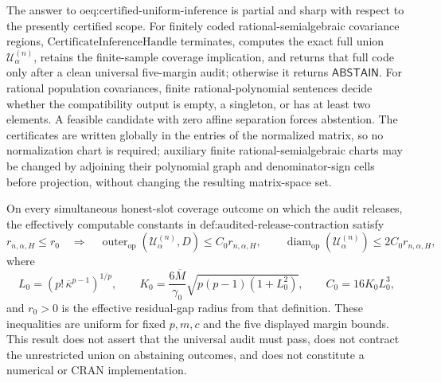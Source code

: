 The answer to \(\text{oeq:certified-uniform-inference}\) is partial and sharp with respect to the presently certified scope.  For finitely coded rational-semialgebraic covariance regions, \(\text{CertificateInferenceHandle}\) terminates, computes the exact full union \(\mathcal U^{(n)}_\alpha\), retains the finite-sample coverage implication, and returns that full code only after a clean universal five-margin audit; otherwise it returns \(\mathsf{ABSTAIN}\).  For rational population covariances, finite rational-polynomial sentences decide whether the compatibility output is empty, a singleton, or has at least two elements.  A feasible candidate with zero affine separation forces abstention.  The certificates are written globally in the entries of the normalized matrix, so no normalization chart is required; auxiliary finite rational-semialgebraic charts may be changed by adjoining their polynomial graph and denominator-sign cells before projection, without changing the resulting matrix-space set.

On every simultaneous honest-slot coverage outcome on which the audit releases, the effectively computable constants in \(\text{def:audited-release-contraction}\) satisfy
\[
 r_{n,\alpha,H}\leq r_0
 \quad\Longrightarrow\quad
 \operatorname{outer}_{\mathrm{op}}(\mathcal U^{(n)}_\alpha,D)
 \leq C_0r_{n,\alpha,H},
 \qquad
 \operatorname{diam}_{\mathrm{op}}(\mathcal U^{(n)}_\alpha)
 \leq2C_0r_{n,\alpha,H},
\]
where
\[
 L_0=(p!\,\overline\kappa^{p-1})^{1/p},\qquad
 K_0=\frac{6\overline M}{\gamma _0}\sqrt{p(p-1)(1+L_0^2)},
 \qquad C_0=16K_0L_0^3,
\]
and \(r_0>0\) is the effective residual-gap radius from that definition.  These inequalities are uniform for fixed \(p,m,c\) and the five displayed margin bounds.  This result does not assert that the universal audit must pass, does not contract the unrestricted union on abstaining outcomes, and does not constitute a numerical or CRAN implementation.